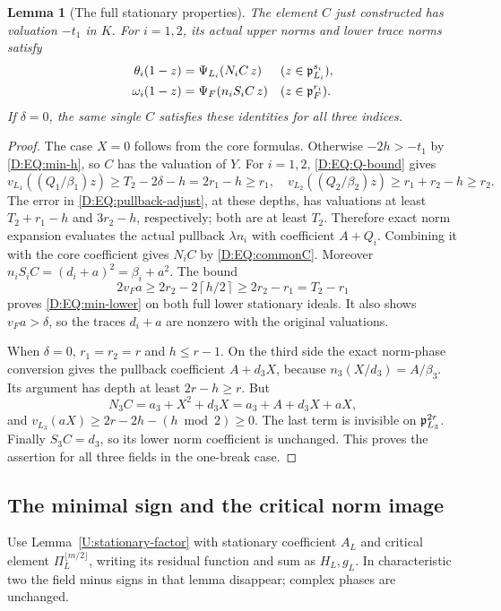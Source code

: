 \documentclass[11pt]{amsart}
\newtheorem{lemma}[theorem]{Lemma}
\theoremstyle{definition}
\theoremstyle{remark}
\newcommand{\ceil}[1]{\left\lceil #1\right\rceil}
\begin{document}
\begin{lemma}[The full stationary properties]\label{D:EQ:min-origin}
The element $C$ just constructed has valuation $-t_1$ in $K$.
For $i=1,2$, its actual upper norms and lower trace norms satisfy
\begin{align}
 \theta_i(1-z)&=\Psi_{L_i}(N_iC\,z)
                            &&(z\in\mathfrak p_{L_i}^{s_i}),       \label{D:EQ:min-core}\\
 \omega_i(1-z)&=\Psi_F(n_iS_iC\,z)
                            &&(z\in\mathfrak p_F^{r_i}).          \label{D:EQ:min-lower}
\end{align}
If $\delta=0$, the same single $C$ satisfies these identities for all
three indices.
\end{lemma}
\begin{proof}
The case $X=0$ follows from the core formulas. Otherwise
$-2h>-t_1$ by \eqref{D:EQ:min-h}, so $C$ has the valuation of $Y$.
For $i=1,2$, \eqref{D:EQ:Q-bound} gives
\[
 v_{L_1}((Q_1/\beta_1)z)\ge T_2-2\delta-h=2r_1-h\ge r_1,
 \quad
 v_{L_2}((Q_2/\beta_2)z)\ge r_1+r_2-h\ge r_2.
\]
The error in \eqref{D:EQ:pullback-adjust}, at these depths, has valuations
at least $T_2+r_1-h$ and $3r_2-h$, respectively; both are at least
$T_2$. Therefore exact norm expansion evaluates the actual pullback
$\lambda n_i$ with coefficient $A+Q_i$. Combining it with the core
coefficient gives $N_iC$ by \eqref{D:EQ:commonC}.
Moreover $n_iS_iC=(d_i+a)^2=\beta_i+a^2$.
The bound
\[
 2v_Fa\ge2r_2-2\ceil{h/2}\ge2r_2-r_1=T_2-r_1
\]
proves \eqref{D:EQ:min-lower} on both full lower stationary ideals.
It also shows $v_Fa>\delta$, so the traces $d_i+a$ are nonzero with
the original valuations.

When $\delta=0$, $r_1=r_2=r$ and $h\le r-1$.
On the third side the exact norm-phase conversion gives the
pullback coefficient $A+d_3X$, because
$n_3(X/d_3)=A/\beta_3$. Its argument has depth at least $2r-h\ge r$.
But
\[
 N_3C=a_3+X^2+d_3X
       =a_3+A+d_3X+aX,
\]
and $v_{L_3}(aX)\ge2r-2h-(h\bmod2)\ge0$.
The last term is invisible on $\mathfrak p_{L_3}^{2r}$.
Finally $S_3C=d_3$, so its lower norm coefficient is unchanged.
This proves the assertion for all three fields in the one-break case.
\end{proof}

\subsection{The minimal sign and the critical norm image}
Use Lemma~\ref{U:stationary-factor} with stationary coefficient $A_L$
and critical element $\Pi_L^{\lfloor m/2\rfloor}$, writing its residual
function and sum as $H_L,g_L$. In characteristic two the field minus
signs in that lemma disappear; complex phases are unchanged.
\end{document}
